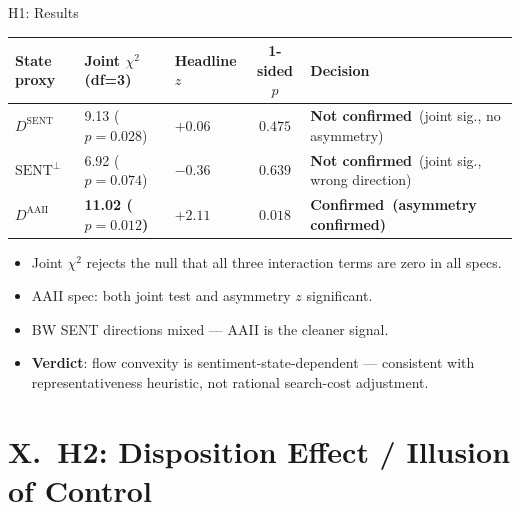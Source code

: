 \documentclass[10pt, aspectratio=169]{beamer}
\newcommand{\yes}{\textcolor{successgreen}{\textbf{Confirmed}}}
\newcommand{\no}{\textcolor{alertred}{\textbf{Not confirmed}}}
\begin{document}
\begin{frame}{H1: Results}
  \scriptsize
  \begin{tabular}{lllcp{4.5cm}}
    \toprule
    State proxy & Joint $\chi^2$ (df=3) & Headline $z$ & 1-sided $p$ & Decision \\
    \midrule
    $D^{\text{SENT}}$     & 9.13 ($p=0.028$)          & $+0.06$ & $0.475$ & \no\ (joint sig., no asymmetry) \\
    $\text{SENT}^\perp$   & 6.92 ($p=0.074$)          & $-0.36$ & $0.639$ & \no\ (joint sig., wrong direction) \\
    $D^{\text{AAII}}$     & \textbf{11.02 ($p=0.012$)} & $\mathbf{+2.11}$ & $\mathbf{0.018}$ & \textbf{\yes\ (asymmetry confirmed)} \\
    \bottomrule
  \end{tabular}
  \normalsize
  \vspace{6pt}
  \begin{itemize}\itemsep3pt
    \item Joint $\chi^2$ rejects the null that all three interaction terms are zero in all specs.
    \item AAII spec: both joint test and asymmetry $z$ significant.
    \item BW SENT directions mixed — AAII is the cleaner signal.
    \item \textbf{Verdict}: flow convexity is sentiment-state-dependent — consistent with
          representativeness heuristic, not rational search-cost adjustment.
  \end{itemize}
\end{frame}

\section{X.\ H2: Disposition Effect / Illusion of Control}
\end{document}
